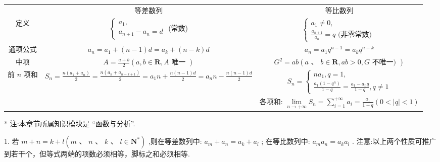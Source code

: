 \begin{center}
\begin{tabular}{|c|c|c|}
\hline
\phantom{X} & 等差数列 & 等比数列 \\
\cline{1-3}
定义 & $\left\{  \begin{array}{l} {a}_{1}, \\  {a}_{n + 1} - {a}_{n} = d \end{array}\right.$ (常数) & $\left\{  \begin{array}{l} {a}_{1} \neq  0, \\  \frac{{a}_{n + 1}}{{a}_{n}} = q\text{ (非零常数) } \end{array}\right.$ \\
\cline{1-3}
通项公式 & ${a}_{n} = {a}_{1} + \left( {n - 1}\right) d = {a}_{k} + \left( {n - k}\right) d$ & ${a}_{n} = {a}_{1}{q}^{n - 1} = {a}_{k}{q}^{n - k}$ \\
\cline{1-3}
中项 & $A = \frac{a + b}{2}\left( {a,b \in  \mathbf{R},A\text{ 唯一 }}\right)$ & ${G}^{2} = {ab}\left( {a\text{ 、 }b \in  \mathbf{R},{ab} > 0,G\text{ 不唯一) }}\right)$ \\
\cline{1-3}
前 $n$ 项和 & ${S}_{n} = \frac{n\left( {{a}_{1} + {a}_{n}}\right) }{2} = \frac{n\left( {{a}_{k} + {a}_{n - k + 1}}\right) }{2}  = {a}_{1}n + \frac{n\left( {n - 1}\right) d}{2} = {a}_{n}n - \frac{n\left( {n - 1}\right) d}{2}$ & ${S}_{n} = \left\{  \begin{array}{l} n{a}_{1},q = 1, \\  \frac{{a}_{1}\left( {1 - {q}^{n}}\right) }{1 - q} = \frac{{a}_{1} - {a}_{n}q}{1 - q},q \neq  1 \end{array}\right.$ \\
\cline{1-3}
\phantom{X} & \phantom{X} & 各项和: $\mathop{\lim }\limits_{{n \rightarrow   + \infty }}{S}_{n} = \mathop{\sum }\limits_{{i = 1}}^{{+\infty }}{a}_{i} = \frac{{a}_{1}}{1 - q}\left( {0 < \left| q\right|  < 1}\right)$ \\
\cline{1-3}
\hline
\end{tabular}
\end{center}

\HRule

* 注:本章节所属知识模块是 “函数与分析”.

\HRule

1. 若 $m + n = k + l\left( {m\text{ 、 }n\text{ 、 }k\text{ 、 }l \in  {\mathbf{N}}^{ * }}\right)$ ,则在等差数列中: ${a}_{m} + {a}_{n} = {a}_{k} + {a}_{l}$ ; 在等比数列中: ${a}_{m}{a}_{n} = {a}_{k}{a}_{l}$ . 注意:以上两个性质可推广到若干个，但等式两端的项数必须相等，脚标之和必须相等.

